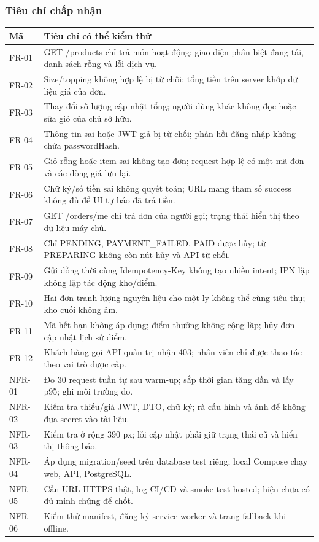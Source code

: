 \documentclass[12pt,a4paper]{article}
\begin{document}
\subsubsection{Tiêu chí chấp nhận}
\begin{longtable}{P{1.4cm}P{13.2cm}}
\toprule\textbf{Mã}&\textbf{Tiêu chí có thể kiểm thử}\\\midrule\endhead
FR-01&GET /products chỉ trả món hoạt động; giao diện phân biệt đang tải, danh sách rỗng và lỗi dịch vụ.\\
FR-02&Size/topping không hợp lệ bị từ chối; tổng tiền trên server khớp dữ liệu giá của đơn.\\
FR-03&Thay đổi số lượng cập nhật tổng; người dùng khác không đọc hoặc sửa giỏ của chủ sở hữu.\\
FR-04&Thông tin sai hoặc JWT giả bị từ chối; phản hồi đăng nhập không chứa passwordHash.\\
FR-05&Giỏ rỗng hoặc item sai không tạo đơn; request hợp lệ có một mã đơn và các dòng giá lưu lại.\\
FR-06&Chữ ký/số tiền sai không quyết toán; URL mang tham số success không đủ để UI tự báo đã trả tiền.\\
FR-07&GET /orders/me chỉ trả đơn của người gọi; trạng thái hiển thị theo dữ liệu máy chủ.\\
FR-08&Chỉ PENDING, PAYMENT\_FAILED, PAID được hủy; từ PREPARING không còn nút hủy và API từ chối.\\
FR-09&Gửi đồng thời cùng Idempotency-Key không tạo nhiều intent; IPN lặp không lặp tác động kho/điểm.\\
FR-10&Hai đơn tranh lượng nguyên liệu cho một ly không thể cùng tiêu thụ; kho cuối không âm.\\
FR-11&Mã hết hạn không áp dụng; điểm thưởng không cộng lặp; hủy đơn cập nhật lịch sử điểm.\\
FR-12&Khách hàng gọi API quản trị nhận 403; nhân viên chỉ được thao tác theo vai trò được cấp.\\
NFR-01&Đo 30 request tuần tự sau warm-up; sắp thời gian tăng dần và lấy p95; ghi môi trường đo.\\
NFR-02&Kiểm tra thiếu/giả JWT, DTO, chữ ký; rà cấu hình và ảnh để không đưa secret vào tài liệu.\\
NFR-03&Kiểm tra ở rộng 390 px; lỗi cập nhật phải giữ trạng thái cũ và hiển thị thông báo.\\
NFR-04&Áp dụng migration/seed trên database test riêng; local Compose chạy web, API, PostgreSQL.\\
NFR-05&Cần URL HTTPS thật, log CI/CD và smoke test hosted; hiện chưa có đủ minh chứng để chốt.\\
NFR-06&Kiểm thử manifest, đăng ký service worker và trang fallback khi offline.\\
\bottomrule
\end{longtable}
\end{document}
